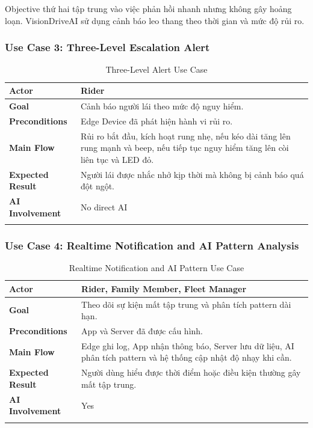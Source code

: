 \documentclass[12pt,a4paper]{article}
\begin{document}
Objective thứ hai tập trung vào việc phản hồi nhanh nhưng không gây hoảng loạn. VisionDriveAI sử dụng cảnh báo leo thang theo thời gian và mức độ rủi ro.

\subsubsection{Use Case 3: Three-Level Escalation Alert}

\begin{longtable}{|P{3.5cm}|P{11cm}|}
\hline
\textbf{Actor} & Rider \\
\hline
\textbf{Goal} & Cảnh báo người lái theo mức độ nguy hiểm. \\
\hline
\textbf{Preconditions} & Edge Device đã phát hiện hành vi rủi ro. \\
\hline
\textbf{Main Flow} & Rủi ro bắt đầu, kích hoạt rung nhẹ, nếu kéo dài tăng lên rung mạnh và beep, nếu tiếp tục nguy hiểm tăng lên còi liên tục và LED đỏ. \\
\hline
\textbf{Expected Result} & Người lái được nhắc nhở kịp thời mà không bị cảnh báo quá đột ngột. \\
\hline
\textbf{AI Involvement} & No direct AI \\
\hline
\caption{Three-Level Alert Use Case}
\end{longtable}

\subsubsection{Use Case 4: Realtime Notification and AI Pattern Analysis}

\begin{longtable}{|P{3.5cm}|P{11cm}|}
\hline
\textbf{Actor} & Rider, Family Member, Fleet Manager \\
\hline
\textbf{Goal} & Theo dõi sự kiện mất tập trung và phân tích pattern dài hạn. \\
\hline
\textbf{Preconditions} & App và Server đã được cấu hình. \\
\hline
\textbf{Main Flow} & Edge ghi log, App nhận thông báo, Server lưu dữ liệu, AI phân tích pattern và hệ thống cập nhật độ nhạy khi cần. \\
\hline
\textbf{Expected Result} & Người dùng hiểu được thời điểm hoặc điều kiện thường gây mất tập trung. \\
\hline
\textbf{AI Involvement} & Yes \\
\hline
\caption{Realtime Notification and AI Pattern Use Case}
\end{longtable}
\end{document}
